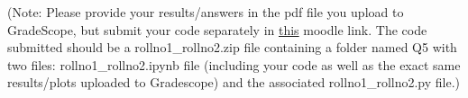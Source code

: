 \documentclass[solution,addpoints,12pt]{exam}
\begin{document}
\begin{questions}
(Note: Please provide your results/answers in the pdf file you upload to GradeScope, but submit your code separately in \href{https://courses.iitm.ac.in/mod/assign/view.php?id=8597&forceview=1}{this} moodle link. The code submitted should be a rollno1\_rollno2.zip file containing a folder named Q5 with two files: rollno1\_rollno2.ipynb file (including your code as well as the exact same results/plots uploaded to Gradescope) and the associated rollno1\_rollno2.py file.)

\end{questions}
\end{document}
